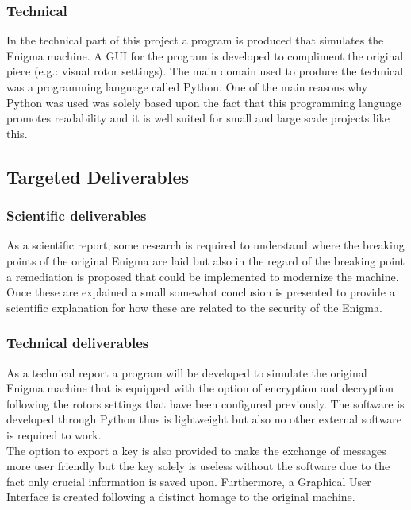 \documentclass[conference,compsoc]{IEEEtran}
\begin{document}
\subsubsection{Technical}
In the technical part of this project a program is produced that simulates the Enigma machine. A GUI for the program is developed to compliment the original piece (e.g.: visual rotor settings). The main domain used to produce the technical was a programming language called Python. One of the main reasons why Python was used was solely based upon the fact that this programming language promotes readability and it is well suited for small and large scale projects like this.\\

\subsection{Targeted Deliverables}
\label{sec-deliverables}
\subsubsection{Scientific deliverables}
As a scientific report, some research is required to understand where the breaking points of the original Enigma are laid but also in the regard of the breaking point a remediation is proposed that could be implemented to modernize the machine. Once these are explained a small somewhat conclusion is presented to provide a scientific explanation for how these are related to the security of the Enigma.

\subsubsection{Technical deliverables}
As a technical report a program will be developed to simulate the original Enigma machine that is equipped with the option of encryption and decryption following the rotors settings that have been configured previously. The software is developed through Python thus is lightweight but also no other external software is required to work. \\
The option to export a key is also provided to make the exchange of messages more user friendly but the key solely is useless without the software due to the fact only crucial information is saved upon. Furthermore, a Graphical User Interface is created following a distinct homage to the original machine.\\


\end{document}
